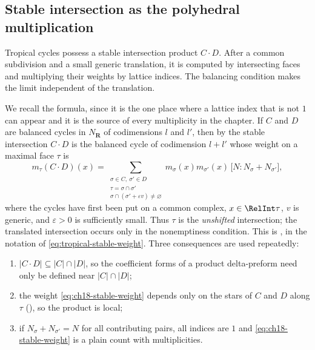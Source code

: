 \subsection{Stable intersection as the polyhedral multiplication}
\label{sec:ch18-stable-intersection}

Tropical cycles possess a stable intersection product $C\cdot D$.  After a
common subdivision and a small generic translation, it is computed by
intersecting faces and multiplying their weights by lattice indices.  The
balancing condition makes the limit independent of the translation.

We recall the formula, since it is the one place where a lattice index that
is not $1$ can appear and it is the source of every multiplicity in the
chapter.  If $C$ and $D$ are balanced cycles in $N_{\mathbf R}$ of
codimensions $l$ and $l'$, then by
 the stable intersection $C\cdot D$ is
the balanced cycle of codimension $l+l'$ whose weight on a maximal face
$\tau$ is
\begin{equation}
\label{eq:ch18-stable-weight}
 m_\tau(C\cdot D)(x)
 =\sum_{\substack{\sigma\in C,\ \sigma'\in D\\
                   \tau=\sigma\cap\sigma'\\
                   \sigma\cap(\sigma'+\varepsilon v)\ne\varnothing}}
 m_\sigma(x)m_{\sigma'}(x)\,
 \bigl[N:N_\sigma+N_{\sigma'}\bigr],
\end{equation}
where the cycles have first been put on a common complex,
$x\in\RelInt\tau$, $v$ is generic, and $\varepsilon>0$ is sufficiently
small.  Thus $\tau$ is the \emph{unshifted} intersection; the translated
intersection occurs only in the nonemptiness condition.  This is
\cite[(1.4.1)]{GK17}, in the notation of
\eqref{eq:tropical-stable-weight}.  Three
consequences are used repeatedly:
\begin{enumerate}
\item\label{itm:ch18-si:support}
 $|C\cdot D|\subseteq|C|\cap|D|$, so the coefficient forms of a product
 delta-preform need only be defined near $|C|\cap|D|$;
\item\label{itm:ch18-si:star}
 the weight \eqref{eq:ch18-stable-weight} depends only on the stars of $C$
 and $D$ along $\tau$ (), so the product is
 local;
\item\label{itm:ch18-si:unimodular}
 if $N_\sigma+N_{\sigma'}=N$ for all contributing pairs, all indices are
 $1$ and \eqref{eq:ch18-stable-weight} is a plain count with multiplicities.
\end{enumerate}

